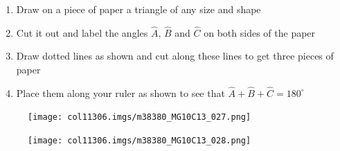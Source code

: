 \begin{table}[H]
          \label{m38380*id317720}\begin{enumerate}[noitemsep,
label=\textbf{\arabic*}. ] 
            \label{m38380*uid41}\item Draw on a piece of paper a triangle of any
size and shape
\label{m38380*uid42}\item Cut it out and label the angles
\begin{math}\hat{A}\end{math}, \begin{math}\hat{B}\end{math} and
\begin{math}\hat{C}\end{math} on both sides of the paper
\label{m38380*uid43}\item Draw dotted lines as shown and cut along these lines
to get three pieces of paper
\label{m38380*uid44}\item Place them along your ruler as shown to see that
\begin{math}\hat{A}+\hat{B}+\hat{C}={180}^{\circ }\end{math}\end{enumerate}
        
          \label{m38380*id317868}
    \setcounter{subfigure}{0}


	\begin{figure}[H] %
    \begin{center}
   
\label{m38380*id317874!!!underscore!!!media}\label{
m38380*id317874!!!underscore!!!printimage}\texttt{[image: 
col11306.imgs/m38380\_MG10C13\_027.png]} %
        
      \vspace{2pt}
    \vspace{.1in}
    
    \end{center}

 \end{figure}   

    \addtocounter{footnote}{-0}
    
    \setcounter{subfigure}{0}


	\begin{figure}[H] %
    \begin{center}
   
\label{m38380*id317886!!!underscore!!!media}\label{
m38380*id317886!!!underscore!!!printimage}\texttt{[image: 
col11306.imgs/m38380\_MG10C13\_028.png]} %
        

\end{center}
\end{figure}
\end{table}
